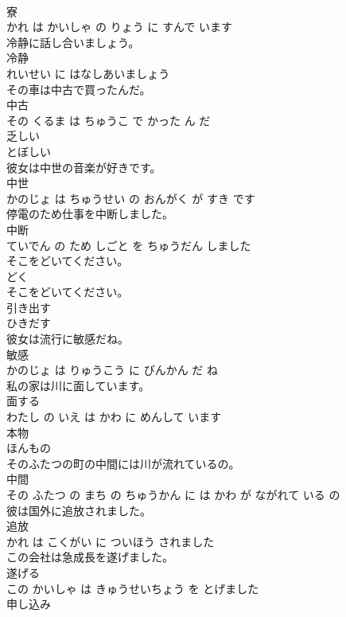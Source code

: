 \documentclass[8pt]{extreport}
\begin{document}
\begin{CJK}{UTF8}{min}
\\	寮 
\\	かれ は かいしゃ の りょう に すんで います			
\\	冷静に話し合いましょう。	
\\	冷静 
\\	れいせい に はなしあいましょう			
\\	その車は中古で買ったんだ。	
\\	中古 
\\	その くるま は ちゅうこ で かった ん だ			
\\	乏しい	
\\	とぼしい			
\\	彼女は中世の音楽が好きです。	
\\	中世 
\\	かのじょ は ちゅうせい の おんがく が すき です			
\\	停電のため仕事を中断しました。	
\\	中断 
\\	ていでん の ため しごと を ちゅうだん しました			
\\	そこをどいてください。	
\\	どく 
\\	そこをどいてください。			
\\	引き出す	
\\	ひきだす			
\\	彼女は流行に敏感だね。	
\\	敏感 
\\	かのじょ は りゅうこう に びんかん だ ね			
\\	私の家は川に面しています。	
\\	面する 
\\	わたし の いえ は かわ に めんして います			
\\	本物	
\\	ほんもの			
\\	そのふたつの町の中間には川が流れているの。	
\\	中間 
\\	その ふたつ の まち の ちゅうかん に は かわ が ながれて いる の			
\\	彼は国外に追放されました。	
\\	追放 
\\	かれ は こくがい に ついほう されました			
\\	この会社は急成長を遂げました。	
\\	遂げる 
\\	この かいしゃ は きゅうせいちょう を とげました			
\\	申し込み	

\end{CJK}
\end{document}
